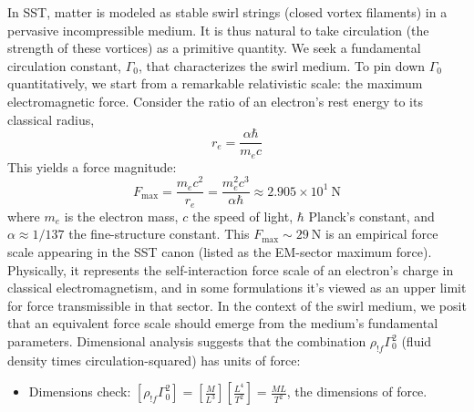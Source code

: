 \documentclass[11pt]{article}
\begin{document}
    In SST, matter is modeled as stable swirl strings (closed vortex filaments) in a pervasive incompressible medium. It is thus natural to take circulation (the strength of these vortices) as a primitive quantity. We seek a fundamental circulation constant, $\Gamma_0$, that characterizes the swirl medium. To pin down $\Gamma_0$ quantitatively, we start from a remarkable relativistic scale: the maximum electromagnetic force. Consider the ratio of an electron’s rest energy to its classical radius,
    \begin{equation}
    r_e = \frac{\alpha \hbar}{m_e c}
    \end{equation}
    This yields a force magnitude:
    \begin{equation}
    F_{\max} = \frac{m_e c^2}{r_e} = \frac{m_e^2 c^3}{\alpha \hbar} \approx 2.905 \times 10^1~\text{N}
    \end{equation}
    where $m_e$ is the electron mass, $c$ the speed of light, $\hbar$ Planck’s constant, and $\alpha \approx 1/137$ the fine-structure constant. This $F_{\max} \sim 29~\text{N}$ is an empirical force scale appearing in the SST canon (listed as the EM-sector maximum force). Physically, it represents the self-interaction force scale of an electron’s charge in classical electromagnetism, and in some formulations it’s viewed as an upper limit for force transmissible in that sector. In the context of the swirl medium, we posit that an equivalent force scale should emerge from the medium’s fundamental parameters. Dimensional analysis suggests that the combination $\rho_{!f} \Gamma_0^2$ (fluid density times circulation-squared) has units of force:
\begin{itemize}
        \item Dimensions check: $[\rho_{!f}\Gamma_0^2] = \left[\frac{M}{L^3}\right]\left[\frac{L^4}{T^2}\right] = \frac{M L}{T^2}$, the dimensions of force.
\end{itemize}
\end{document}
